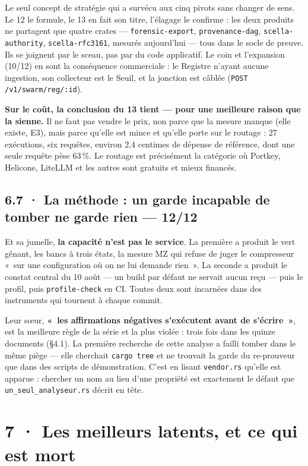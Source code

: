 \documentclass[10pt]{article}
\newcommand{\code}[1]{\texttt{\small #1}}
\newcommand{\pc}{\,\%}
\begin{document}
Le seul concept de stratégie qui a survécu aux cinq pivots sans changer de sens. Le 12 le formule, le 13 en fait son
titre, l'élagage le confirme : les deux produits ne partagent que quatre crates --- \code{forensic-export},
\code{provenance-dag}, \code{scella-authority}, \code{scella-rfc3161}, mesurés aujourd'hui --- tous dans le socle de
preuve. Ils se joignent par le sceau, pas par du code applicatif. Le coin et l'expansion (10/12) en sont la
conséquence commerciale : le Registre n'ayant aucune ingestion, son collecteur est le Seuil, et la jonction est câblée
(\code{POST /v1/swarm/reg/:id}).

\textbf{Sur le coût, la conclusion du 13 tient --- pour une meilleure raison que la sienne.} Il ne faut pas vendre le
prix, non parce que la mesure manque (elle existe, E3), mais parce qu'elle est mince et qu'elle porte sur le routage :
27 exécutions, six requêtes, environ 2,4 centimes de dépense de référence, dont une seule requête pèse 63\pc{}. Le
routage est précisément la catégorie où Portkey, Helicone, LiteLLM et les autres sont gratuits et mieux financés.

\subsection{6.7 · La méthode : un garde incapable de tomber ne garde rien --- 12/12}

Et sa jumelle, \textbf{la capacité n'est pas le service}. La première a produit le vert gênant, les bancs à trois
états, la mesure MZ qui refuse de juger le compresseur «~sur une configuration où on ne lui demande rien~». La seconde
a produit le constat central du 10 août --- un build par défaut ne servait aucun reçu --- puis le profil, puis
\code{profile-check} en CI. Toutes deux sont incarnées dans des instruments qui tournent à chaque commit.

Leur sœur, \textbf{«~les affirmations négatives s'exécutent avant de s'écrire~»}, est la meilleure règle de la série
et la plus violée : trois fois dans les quinze documents (§4.1). La première recherche de cette analyse a failli
tomber dans le même piège --- elle cherchait \code{cargo tree} et ne trouvait la garde du re-prouveur que dans des
scripts de démonstration. C'est en lisant \code{vendor.rs} qu'elle est apparue : chercher un nom au lieu d'une
propriété est exactement le défaut que \code{un\_seul\_analyseur.rs} décrit en tête.

\section{7 · Les meilleurs latents, et ce qui est mort}
\end{document}
